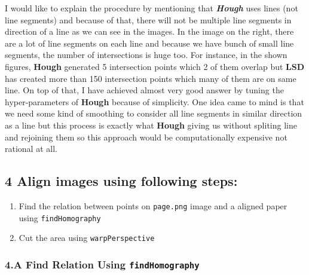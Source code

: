 \documentclass[11pt]{article}
\providecommand{\tightlist}{%
      \setlength{\itemsep}{0pt}\setlength{\parskip}{0pt}}
\begin{document}
    I would like to explain the procedure by mentioning that
\emph{\textbf{Hough}} uses lines (not line segments) and because of
that, there will not be multiple line segments in direction of a line as
we can see in the images. In the image on the right, there are a lot of
line segments on each line and because we have bunch of small line
segments, the number of intersections is huge too. For instance, in the
shown figures, \textbf{Hough} generated 5 intersection points which 2 of
them overlap but \textbf{LSD} has created more than 150 intersection
points which many of them are on same line. On top of that, I have
achieved almost very good answer by tuning the hyper-parameters of
\textbf{Hough} because of simplicity. One idea came to mind is that we
need some kind of smoothing to consider all line segments in similar
direction as a line but this process is exactly what \textbf{Hough}
giving us without spliting line and rejoining them so this approach
would be computationally expensive not rational at all.

    \hypertarget{align-images-using-following-steps}{%
\subsection{4 Align images using following
steps:}\label{align-images-using-following-steps}}

\begin{enumerate}
\def\labelenumi{\arabic{enumi}.}
\tightlist
\item
  Find the relation between points on \texttt{page.png} image and a
  aligned paper using \texttt{findHomography}
\item
  Cut the area using \texttt{warpPerspective}
\end{enumerate}

    \hypertarget{a-find-relation-using-findhomography}{%
\subsubsection{\texorpdfstring{4.A Find Relation Using
\texttt{findHomography}}{4.A Find Relation Using findHomography}}\label{a-find-relation-using-findhomography}}
\end{document}
